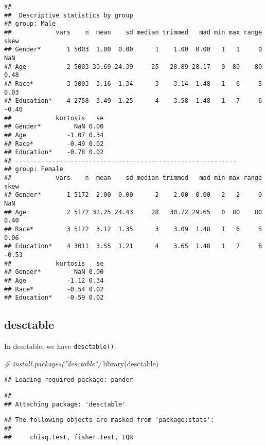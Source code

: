 \documentclass[
]{book}
\newenvironment{Shaded}{\begin{snugshade}}{\end{snugshade}}
\newcommand{\CommentTok}[1]{\textcolor[rgb]{0.56,0.35,0.01}{\textit{#1}}}
\newcommand{\FunctionTok}[1]{\textcolor[rgb]{0.00,0.00,0.00}{#1}}
\newcommand{\NormalTok}[1]{#1}
\begin{document}
\begin{verbatim}
##
##  Descriptive statistics by group
## group: Male
##            vars    n  mean    sd median trimmed   mad min max range  skew
## Gender*       1 5003  1.00  0.00      1    1.00  0.00   1   1     0   NaN
## Age           2 5003 30.69 24.39     25   28.89 28.17   0  80    80  0.48
## Race*         3 5003  3.16  1.34      3    3.14  1.48   1   6     5  0.03
## Education*    4 2758  3.49  1.25      4    3.58  1.48   1   7     6 -0.40
##            kurtosis   se
## Gender*         NaN 0.00
## Age           -1.07 0.34
## Race*         -0.49 0.02
## Education*    -0.78 0.02
## ------------------------------------------------------------
## group: Female
##            vars    n  mean    sd median trimmed   mad min max range  skew
## Gender*       1 5172  2.00  0.00      2    2.00  0.00   2   2     0   NaN
## Age           2 5172 32.25 24.43     28   30.72 29.65   0  80    80  0.40
## Race*         3 5172  3.12  1.35      3    3.09  1.48   1   6     5  0.06
## Education*    4 3011  3.55  1.21      4    3.65  1.48   1   7     6 -0.53
##            kurtosis   se
## Gender*         NaN 0.00
## Age           -1.12 0.34
## Race*         -0.54 0.02
## Education*    -0.59 0.02
\end{verbatim}

\hypertarget{desctable}{%
\subsection{desctable}\label{desctable}}

In desctable, we have \texttt{desctable()}:

\begin{Shaded}
\begin{Highlighting}[]
\CommentTok{\# install.packages("desctable")}
\FunctionTok{library}\NormalTok{(desctable)}
\end{Highlighting}
\end{Shaded}

\begin{verbatim}
## Loading required package: pander
\end{verbatim}

\begin{verbatim}
##
## Attaching package: 'desctable'
\end{verbatim}

\begin{verbatim}
## The following objects are masked from 'package:stats':
##
##     chisq.test, fisher.test, IQR
\end{verbatim}
\end{document}
